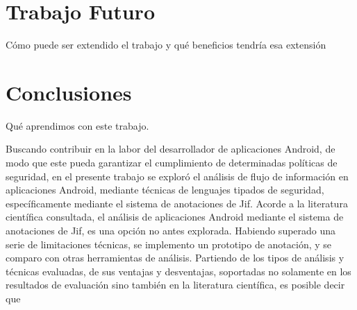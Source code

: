 \section{Trabajo Futuro}
Cómo puede ser extendido el trabajo y qué beneficios tendría esa extensión 

\section{Conclusiones}
Qué aprendimos con este trabajo.\newline

Buscando contribuir en la labor del desarrollador de aplicaciones Android, de
modo que este pueda garantizar el cumplimiento de determinadas políticas de
seguridad, en el presente trabajo se exploró el análisis de flujo de información
en aplicaciones Android, mediante técnicas de lenguajes tipados de seguridad,
específicamente mediante el sistema de anotaciones de Jif.\newline 
Acorde a la literatura científica consultada, el análisis de aplicaciones
Android mediante el sistema de anotaciones de Jif, es una opción no antes
explorada.\newline
Habiendo superado una serie de limitaciones técnicas, se implemento un
prototipo de anotación, y se comparo con otras herramientas de análisis.
Partiendo de los tipos de análisis y técnicas evaluadas, de sus ventajas y
desventajas, soportadas no solamente en los resultados de evaluación sino
también en la literatura científica, es posible decir que 



